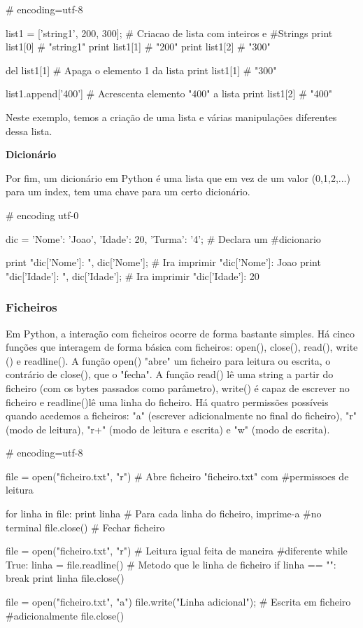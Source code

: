 \documentclass[11pt,openright,twoside]{report}
\begin{document}
\smallskip
\begin{Python}
# encoding=utf-8


list1 = ['string1', 200, 300];			# Criacao de lista com inteiros e #Strings
print list1[0]							# "string1"
print list1[1]							# "200"
print list1[2]							# "300"

del list1[1]							# Apaga o elemento 1 da lista
print list1[1]							# "300"

list1.append['400']						# Acrescenta elemento "400" a lista
print list1[2]							# "400"

\end{Python}
\smallskip

Neste exemplo, temos a criação de uma lista e várias manipulações diferentes dessa lista.
\medskip

\textbf{Dicionário}
\smallskip

Por fim, um dicionário em Python é uma lista que em vez de um valor (0,1,2,...) para um index, tem uma chave para um certo dicionário.

\smallskip
\begin{Python}
# encoding utf-0

dic = {'Nome': 'Joao', 'Idade': 20, 'Turma': '4'};	# Declara um #dicionario

print "dic['Nome']: ", dic['Nome'];		# Ira imprimir "dic['Nome']: Joao
print "dic['Idade']: ", dic['Idade'];	# Ira imprimir "dic['Idade']: 20

\end{Python}
\medskip

\subsubsection{Ficheiros}
Em Python, a interação com ficheiros ocorre de forma bastante simples. Há cinco funções que interagem de forma básica com ficheiros: open(), close(), read(), write () e readline(). A função open() "abre" um ficheiro para leitura ou escrita, o contrário de close(), que o "fecha". A função read() lê uma string a partir do ficheiro (com os bytes passados como parâmetro), write() é capaz de escrever no ficheiro e readline()lê uma linha do ficheiro.
Há quatro permissões possíveis quando acedemos a ficheiros: "a" (escrever adicionalmente no final do ficheiro), "r" (modo de leitura), "r+" (modo de leitura e escrita) e "w" (modo de escrita).

\smallskip
\begin{Python}
# encoding=utf-8

file = open("ficheiro.txt", "r")			# Abre ficheiro "ficheiro.txt" com #permissoes de leitura

for linha in file:
	print linha								# Para cada linha do ficheiro, imprime-a #no terminal
file.close()								# Fechar ficheiro

file = open("ficheiro.txt", "r")			# Leitura igual feita de maneira #diferente
while True:									
	linha = file.readline()					# Metodo que le linha de ficheiro
	if linha == "":
		break
	print linha
file.close()

file = open("ficheiro.txt", "a")
file.write("Linha adicional");				# Escrita em ficheiro #adicionalmente
file.close()
\end{Python}
\smallskip
\end{document}
